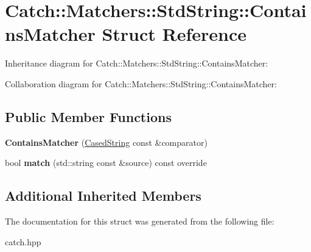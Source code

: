 \hypertarget{structCatch_1_1Matchers_1_1StdString_1_1ContainsMatcher}{}\section{Catch\+:\+:Matchers\+:\+:Std\+String\+:\+:Contains\+Matcher Struct Reference}
\label{structCatch_1_1Matchers_1_1StdString_1_1ContainsMatcher}


Inheritance diagram for Catch\+:\+:Matchers\+:\+:Std\+String\+:\+:Contains\+Matcher\+:


Collaboration diagram for Catch\+:\+:Matchers\+:\+:Std\+String\+:\+:Contains\+Matcher\+:
\subsection*{Public Member Functions}
\begin{DoxyCompactItemize}
\item 
{\bfseries Contains\+Matcher} (\hyperlink{structCatch_1_1Matchers_1_1StdString_1_1CasedString}{Cased\+String} const \&comparator)\hypertarget{structCatch_1_1Matchers_1_1StdString_1_1ContainsMatcher_acc892883c8409e34b28c9b39d4ef1fe3}{}\label{structCatch_1_1Matchers_1_1StdString_1_1ContainsMatcher_acc892883c8409e34b28c9b39d4ef1fe3}

\item 
bool {\bfseries match} (std\+::string const \&source) const override\hypertarget{structCatch_1_1Matchers_1_1StdString_1_1ContainsMatcher_a630628b234b037be83fe587081a80b53}{}\label{structCatch_1_1Matchers_1_1StdString_1_1ContainsMatcher_a630628b234b037be83fe587081a80b53}

\end{DoxyCompactItemize}
\subsection*{Additional Inherited Members}


The documentation for this struct was generated from the following file\+:\begin{DoxyCompactItemize}
\item 
catch.\+hpp\end{DoxyCompactItemize}
